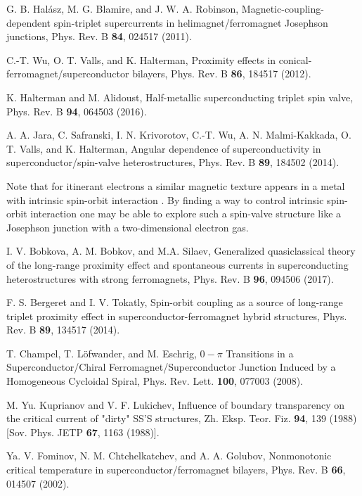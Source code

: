 \documentclass[prb,amsmath,amssymb,reprint]{revtex4-2}
\begin{document}
\begin{thebibliography}{99}
 G. B. Hal\'{a}sz, M. G. Blamire, and J. W. A. Robinson,
Magnetic-coupling-dependent spin-triplet supercurrents in helimagnet/ferromagnet Josephson junctions,
Phys. Rev. B \textbf{84}, 024517 (2011).

 C.-T. Wu, O. T. Valls, and K. Halterman,
Proximity effects in conical-ferromagnet/superconductor bilayers,
Phys. Rev. B
\textbf{86}, 184517 (2012).

 K. Halterman and M. Alidoust,
Half-metallic superconducting triplet spin valve,
Phys. Rev. B \textbf{94}, 064503 (2016).

 A. A. Jara, C. Safranski, I. N. Krivorotov, C.-T. Wu, A.
N. Malmi-Kakkada, O. T. Valls, and K. Halterman,
Angular dependence of superconductivity in superconductor/spin-valve heterostructures,
Phys. Rev. B \textbf{89},
184502 (2014).

Note that for itinerant electrons a similar magnetic texture  appears in a metal with intrinsic
spin-orbit interaction \cite{BergeretSOI2014,Bobkovy}.
By finding a way to control intrinsic spin-orbit interaction one may be able to explore such a spin-valve structure
like a Josephson junction with a two-dimensional electron gas.

 I. V. Bobkova, A. M. Bobkov, and M.A. Silaev,
Generalized quasiclassical theory of the long-range proximity effect and spontaneous
currents in superconducting heterostructures with strong ferromagnets,
Phys. Rev. B \textbf{96}, 094506 (2017).

F. S. Bergeret and I. V. Tokatly,
Spin-orbit coupling as a source of long-range triplet proximity effect in superconductor-ferromagnet hybrid structures,
Phys. Rev. B \textbf{89}, 134517 (2014).

 T. Champel, T. L\"{o}fwander, and M. Eschrig,
$0-\pi$ Transitions in a Superconductor/Chiral Ferromagnet/Superconductor Junction Induced by a Homogeneous Cycloidal Spiral,
Phys. Rev.
Lett. \textbf{100}, 077003 (2008).

 M. Yu. Kuprianov and V. F. Lukichev,
Influence of boundary transparency on the critical current of "dirty" SS'S structures, Zh. Eksp. Teor. Fiz.
\textbf{94}, 139 (1988) [Sov. Phys. JETP \textbf{67}, 1163 (1988)].

 Ya. V. Fominov, N. M. Chtchelkatchev, and A. A.
Golubov,
Nonmonotonic critical temperature in superconductor/ferromagnet bilayers,
Phys. Rev. B \textbf{66}, 014507 (2002).


\end{thebibliography}
\end{document}
